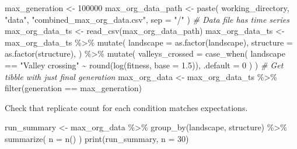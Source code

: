 \documentclass[
]{book}
\newenvironment{Shaded}{\begin{snugshade}}{\end{snugshade}}
\newcommand{\AttributeTok}[1]{\textcolor[rgb]{0.77,0.63,0.00}{#1}}
\newcommand{\CommentTok}[1]{\textcolor[rgb]{0.56,0.35,0.01}{\textit{#1}}}
\newcommand{\DecValTok}[1]{\textcolor[rgb]{0.00,0.00,0.81}{#1}}
\newcommand{\FloatTok}[1]{\textcolor[rgb]{0.00,0.00,0.81}{#1}}
\newcommand{\FunctionTok}[1]{\textcolor[rgb]{0.00,0.00,0.00}{#1}}
\newcommand{\NormalTok}[1]{#1}
\newcommand{\OtherTok}[1]{\textcolor[rgb]{0.56,0.35,0.01}{#1}}
\newcommand{\SpecialCharTok}[1]{\textcolor[rgb]{0.00,0.00,0.00}{#1}}
\newcommand{\StringTok}[1]{\textcolor[rgb]{0.31,0.60,0.02}{#1}}
\begin{document}
\begin{Shaded}
\begin{Highlighting}[]
\NormalTok{max\_generation }\OtherTok{\textless{}{-}} \DecValTok{100000}
\NormalTok{max\_org\_data\_path }\OtherTok{\textless{}{-}} \FunctionTok{paste}\NormalTok{(}
\NormalTok{  working\_directory,}
  \StringTok{"data"}\NormalTok{,}
  \StringTok{"combined\_max\_org\_data.csv"}\NormalTok{,}
  \AttributeTok{sep =} \StringTok{"/"}
\NormalTok{)}
\CommentTok{\# Data file has time series}
\NormalTok{max\_org\_data\_ts }\OtherTok{\textless{}{-}} \FunctionTok{read\_csv}\NormalTok{(max\_org\_data\_path)}
\NormalTok{max\_org\_data\_ts }\OtherTok{\textless{}{-}}\NormalTok{ max\_org\_data\_ts }\SpecialCharTok{\%\textgreater{}\%}
  \FunctionTok{mutate}\NormalTok{(}
    \AttributeTok{landscape =} \FunctionTok{as.factor}\NormalTok{(landscape),}
    \AttributeTok{structure =} \FunctionTok{as.factor}\NormalTok{(structure),}
\NormalTok{  ) }\SpecialCharTok{\%\textgreater{}\%}
  \FunctionTok{mutate}\NormalTok{(}
    \AttributeTok{valleys\_crossed =} \FunctionTok{case\_when}\NormalTok{(}
\NormalTok{      landscape }\SpecialCharTok{==} \StringTok{"Valley crossing"} \SpecialCharTok{\textasciitilde{}} \FunctionTok{round}\NormalTok{(}\FunctionTok{log}\NormalTok{(fitness, }\AttributeTok{base =} \FloatTok{1.5}\NormalTok{)),}
      \AttributeTok{.default =} \DecValTok{0}
\NormalTok{    )}
\NormalTok{  )}
\CommentTok{\# Get tibble with just final generation}
\NormalTok{max\_org\_data }\OtherTok{\textless{}{-}}\NormalTok{ max\_org\_data\_ts }\SpecialCharTok{\%\textgreater{}\%}
  \FunctionTok{filter}\NormalTok{(generation }\SpecialCharTok{==}\NormalTok{ max\_generation)}
\end{Highlighting}
\end{Shaded}

Check that replicate count for each condition matches expectations.

\begin{Shaded}
\begin{Highlighting}[]
\NormalTok{run\_summary }\OtherTok{\textless{}{-}}\NormalTok{ max\_org\_data }\SpecialCharTok{\%\textgreater{}\%}
  \FunctionTok{group\_by}\NormalTok{(landscape, structure) }\SpecialCharTok{\%\textgreater{}\%}
  \FunctionTok{summarize}\NormalTok{(}
    \AttributeTok{n =} \FunctionTok{n}\NormalTok{()}
\NormalTok{  )}
\FunctionTok{print}\NormalTok{(run\_summary, }\AttributeTok{n =} \DecValTok{30}\NormalTok{)}
\end{Highlighting}
\end{Shaded}
\end{document}
